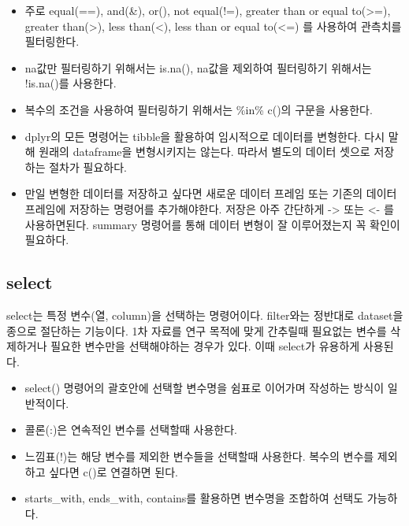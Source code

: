 \documentclass[
]{book}
\newenvironment{Shaded}{\begin{snugshade}}{\end{snugshade}}
\newcommand{\DecValTok}[1]{\textcolor[rgb]{0.00,0.00,0.81}{#1}}
\newcommand{\FunctionTok}[1]{\textcolor[rgb]{0.13,0.29,0.53}{\textbf{#1}}}
\newcommand{\NormalTok}[1]{#1}
\newcommand{\OtherTok}[1]{\textcolor[rgb]{0.56,0.35,0.01}{#1}}
\newcommand{\SpecialCharTok}[1]{\textcolor[rgb]{0.81,0.36,0.00}{\textbf{#1}}}
\providecommand{\tightlist}{%
  \setlength{\itemsep}{0pt}\setlength{\parskip}{0pt}}
\begin{document}
\begin{itemize}
\tightlist
\item
  주로 equal(==), and(\&), or(\textbar), not equal(!=), greater than or equal to(\textgreater=), greater than(\textgreater), less than(\textless), less than or equal to(\textless=) 를 사용하여 관측치를 필터링한다.
\item
  na값만 필터링하기 위해서는 is.na(), na값을 제외하여 필터링하기 위해서는 !is.na()를 사용한다.
\item
  복수의 조건을 사용하여 필터링하기 위해서는 \%in\% c()의 구문을 사용한다.
\item
  dplyr의 모든 명령어는 tibble을 활용하여 임시적으로 데이터를 변형한다. 다시 말해 원래의 dataframe을 변형시키지는 않는다. 따라서 별도의 데이터 셋으로 저장하는 절차가 필요하다.
\item
  만일 변형한 데이터를 저장하고 싶다면 새로운 데이터 프레임 또는 기존의 데이터 프레임에 저장하는 명령어를 추가해야한다. 저장은 아주 간단하게 -\textgreater{} 또는 \textless- 를 사용하면된다. summary 명령어를 통해 데이터 변형이 잘 이루어졌는지 꼭 확인이 필요하다.
\end{itemize}

\begin{Shaded}
\end{Shaded}

\subsection{select}\label{select}

select는 특정 변수(열, column)을 선택하는 명령어이다. filter와는 정반대로 dataset을 종으로 절단하는 기능이다. 1차 자료를 연구 목적에 맞게 간추릴때 필요없는 변수를 삭제하거나 필요한 변수만을 선택해야하는 경우가 있다. 이때 select가 유용하게 사용된다.

\begin{itemize}
\tightlist
\item
  select() 명령어의 괄호안에 선택할 변수명을 쉼표로 이어가며 작성하는 방식이 일반적이다.
\item
  콜론(:)은 연속적인 변수를 선택할때 사용한다.
\item
  느낌표(!)는 해당 변수를 제외한 변수들을 선택할때 사용한다. 복수의 변수를 제외하고 싶다면 c()로 연결하면 된다.
\item
  starts\_with, ends\_with, contains를 활용하면 변수명을 조합하여 선택도 가능하다.
\end{itemize}
\end{document}
